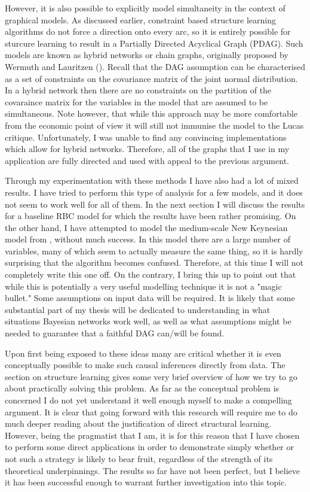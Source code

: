 \documentclass{article}
\begin{document}
However, it is also possible to explicitly model simultaneity in the context of graphical models. As discussed earlier, constraint based structure learning algorithms do not force a direction onto every arc, so it is entirely possible for sturcure learning to result in a Partially Directed Acyclical Graph (PDAG). Such models are known as hybrid networks or chain graphs, originally proposed by Wermuth and Lauritzen (\citeyear{wermuth1990substantive}). Recall that the DAG assumption can be characterised as a set of constraints on the covariance matrix of the joint normal distribution. In a hybrid network then there are no constraints on the partition of the covaraince matrix for the variables in the model that are assumed to be simultaneous. Note however, that while this approach may be more comfortable from the economic point of view it will still not immunise the model to the Lucas critique. Unfortunately, I was unable to find any convincing implementations which allow for hybrid networks. Therefore, all of the graphs that I use in my application are fully directed and used with appeal to the previous argument.

Through my experimentation with these methods I have also had a lot of mixed results. I have tried to perform this type of analysis for a few models, and it does not seem to work well for all of them. In the next section I will discuss the results for a baseline RBC model for which the results have been rather promising. On the other hand, I have attempted to model the medium-scale New Keynesian model from \parencite{smets2007shocks}, without much success. In this model there are a large number of variables, many of which seem to actually measure the same thing, so it is hardly surprising that the algorithm becomes confused. Therefore, at this time I will not completely write this one off. On the contrary, I bring this up to point out that while this is potentially a very useful modelling technique it is not a "magic bullet." Some assumptions on input data will be required. It is likely that some substantial part of my thesis will be dedicated to understanding in what situations Bayesian networks work well, as well as what assumptions might be needed to guarantee that a faithful DAG can/will be found.

Upon first being exposed to these ideas many are critical whether it is even conceptually possible to make such causal inferences directly from data. The section on structure learning gives some very brief overview of how we try to go about practically solving this problem. As far as the conceptual problem is concerned I do not yet understand it well enough myself to make a compelling argument. It is clear that going forward with this research will require me to do much deeper reading about the justification of direct structural learning. However, being the pragmatist that I am, it is for this reason that I have chosen to perform some direct applications in order to demonstrate simply whether or not such a strategy is likely to bear fruit, regardless of the strength of its theoretical underpinnings. The results so far have not been perfect, but I believe it has been successful enough to warrant further investigation into this topic.
\end{document}
